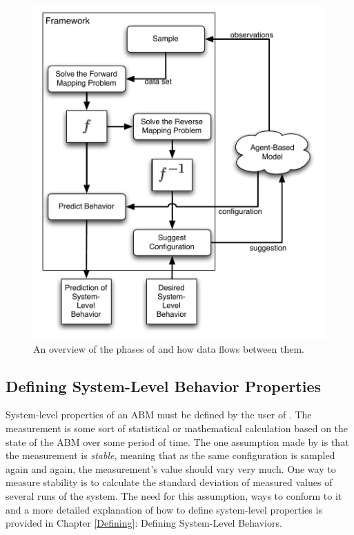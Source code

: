 \begin{figure}[H]
\centering
\includegraphics[scale=1]{images/framework.pdf}
\caption{An overview of the phases of \fw and how data flows between them.}
\label{fig:frameworkdiag}
\end{figure}

\subsection{Defining System-Level Behavior Properties}
System-level properties of an ABM must be defined by the user of \fw.
The measurement is some sort of statistical or mathematical calculation based on the state of the ABM over some period of time.
The one assumption made by \fw is that the measurement is \textit{stable}, meaning that as the same configuration is sampled again and again, the measurement's value should vary very much.
One way to measure stability is to calculate the standard deviation of measured values of several runs of the system.
The need for this assumption, ways to conform to it and a more detailed explanation of how to define system-level properties is provided in Chapter \ref{Defining}: Defining System-Level Behaviors.


